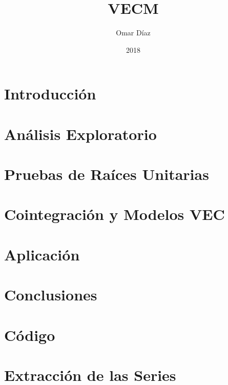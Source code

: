 \documentclass[12pt,twoside]{extbook}
\title{VECM}
\author{Omar Díaz}
\date{2018}
\theoremstyle{plain}
\theoremstyle{definition}
\theoremstyle{remark}
\begin{document}
\frontmatter


 



\tableofcontents

\mainmatter
\chapter*{Introducción}


\chapter{Análisis Exploratorio}


\chapter{Pruebas de Raíces Unitarias}


\chapter{Cointegración y Modelos VEC}



\chapter{Aplicación}



\chapter*{Conclusiones}


%

\nocite{*}
%


\appendix
\chapter{Código}

\chapter{Extracción de las Series}

\end{document}
